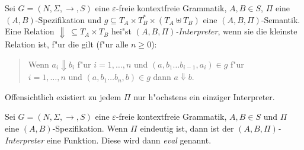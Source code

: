 \documentclass[12pt,a4paper]{article}
\begin{document}
\begin{definition}[Interpreter]
  Sei $G=(N,\Sigma,\to,S)$ eine $\varepsilon$-freie kontextfreie Grammatik, $A,B \in S$,
  $\Pi$ eine $(A,B)$-Spezifikation und $g \subseteq T_A \times T_B^* \times (T_A \uplus T_B)$ eine
  $(A,B,\Pi)$-Semantik. Eine Relation $\Downarrow\ \subseteq T_A \times T_B$ hei"st
  \emph{$(A,B,\Pi)$-Interpreter}, wenn sie die kleinste Relation ist, f"ur die gilt
  (f"ur alle $n \ge 0$):
  \begin{quote}
    Wenn $a_i \Downarrow b_i$ f"ur $i=1,\ldots,n$
    und $(a,b_1 \ldots b_{i-1},a_i) \in g$ f"ur \\
    $i=1,\ldots,n$ und $(a,b_1 \ldots b_n,b) \in g$
    dann $a \Downarrow b$.
  \end{quote}
\end{definition}

Offensichtlich existiert zu jedem $\Pi$ nur h"ochstens ein einziger Interpreter.

\begin{lemma}
  Sei $G=(N,\Sigma,\to,S)$ eine $\varepsilon$-freie kontextfreie Grammatik, $A,B \in S$
  und $\Pi$ eine $(A,B)$-Spezifikation. Wenn $\Pi$ eindeutig ist, dann ist der 
  \emph{$(A,B,\Pi)$-Interpreter} eine Funktion. Diese wird dann \emph{eval} genannt.
\end{lemma}
\end{document}
